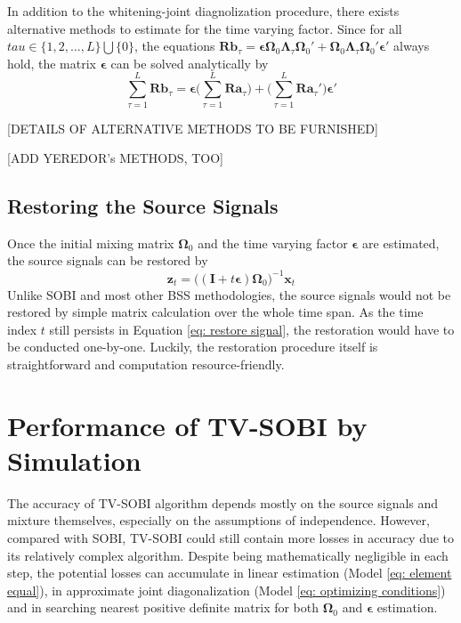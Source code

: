 \documentclass[utf8,english]{gradu3}
\begin{document}
In addition to the whitening-joint diagnolization procedure, there exists alternative methods to estimate for the time varying factor. Since for all $tau\in \{1,2,\dots,L\}\bigcup\{0\}$, the equations $\boldsymbol{Rb}_\tau = \boldsymbol{\epsilon} \boldsymbol\Omega_0 \boldsymbol\Lambda_\tau \boldsymbol \Omega_0' +  \boldsymbol\Omega_0 \boldsymbol\Lambda_\tau \boldsymbol \Omega_0' \boldsymbol{\epsilon}'$ always hold, the matrix $\boldsymbol\epsilon$ can be solved analytically by
\begin{equation}
    \label{eq: solve for epsilon}
    \sum\limits_{\tau=1}^L \boldsymbol {Rb}_\tau = \boldsymbol{\epsilon} \bigg( \sum\limits_{\tau=1}^L \boldsymbol{Ra}_\tau \bigg) + \bigg( \sum\limits_{\tau=1}^L \boldsymbol{Ra} _\tau'\bigg) \boldsymbol{\epsilon'}
\end{equation}

[DETAILS OF ALTERNATIVE METHODS TO BE FURNISHED]

[ADD YEREDOR's METHODS, TOO]

\section{Restoring the Source Signals}

Once the initial mixing matrix $\boldsymbol\Omega_0$ and the time varying factor $\boldsymbol\epsilon$ are estimated, the source signals can be restored by
\begin{equation}
    \label{eq: restore signal}
    \boldsymbol z_t = \bigg( (\boldsymbol I + t\boldsymbol\epsilon) \boldsymbol\Omega_0 \bigg)^{-1} \boldsymbol x_t
\end{equation}
Unlike SOBI and most other BSS methodologies, the source signals would not be restored by simple matrix calculation over the whole time span. As the time index $t$ still persists in Equation \ref{eq: restore signal}, the restoration would have to be conducted one-by-one. Luckily, the restoration procedure itself is straightforward and computation resource-friendly.

\chapter{Performance of TV-SOBI by Simulation}

The accuracy of TV-SOBI algorithm depends mostly on the source signals and mixture themselves, especially on the assumptions of independence. However, compared with SOBI, TV-SOBI could still contain more losses in accuracy due to its relatively complex algorithm. Despite being mathematically negligible in each step, the potential losses can accumulate in linear estimation (Model \ref{eq: element equal}), in approximate joint diagonalization (Model \ref{eq: optimizing conditions}) and in searching nearest positive definite matrix for both $\boldsymbol{\Omega}_0$ and $\boldsymbol{\epsilon}$ estimation.
\end{document}
